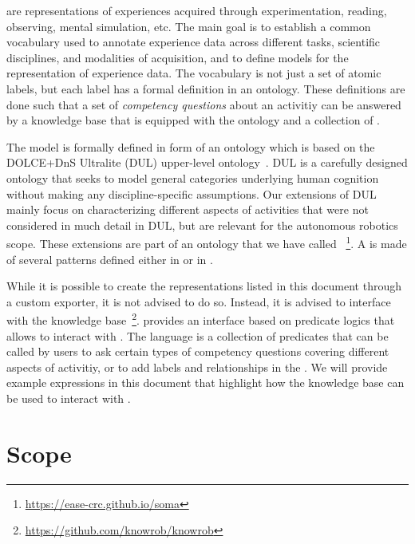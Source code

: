 \neems are representations of experiences acquired through experimentation, reading, observing, mental simulation, etc.
The main goal is to establish a common vocabulary used to annotate experience data across different tasks, scientific disciplines, and modalities of acquisition, and to define models for the representation of experience data.
The vocabulary is not just a set of atomic labels, but each label has a formal definition in an ontology.
These definitions are done such that a set of \emph{competency questions} about an activitiy can be answered by a knowledge base that is equipped with the ontology and a collection of \neems.

The \neem model is formally defined in form of an \owl ontology which is based on the DOLCE+DnS Ultralite (DUL) upper-level ontology~\cite{DOLCE2003}.
DUL is a carefully designed ontology that seeks to model general categories underlying human cognition without making any discipline-specific assumptions.
Our extensions of DUL mainly focus on characterizing different aspects of activities that were not considered in much detail in DUL, but are relevant for the autonomous robotics scope.
These extensions are part of an ontology that we have called
\soma~\footnote{\url{https://ease-crc.github.io/soma}}.
A \neem is made of several patterns defined either in \dul or in \soma.

While it is possible to create the representations listed in this document through a custom exporter, it is not advised to do so.
Instead, it is advised to interface with the
\knowrob knowledge base~\footnote{\url{https://github.com/knowrob/knowrob}}.
\knowrob provides an interface based on predicate logics that allows to interact with \neems.
The language is a collection of predicates that can be called by users to ask certain types of competency questions covering different aspects of activitiy, or to add labels and relationships in the \neemnar.
We will provide example expressions in this document that highlight how the knowledge base can be used to interact with \neems.

\section{Scope} %
\label{sec:scope}


